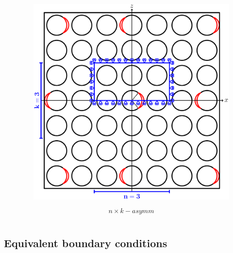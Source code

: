 \documentclass[first,firstsupp,lastsupp,last,hyperref,table]{ETHclass}
\begin{document}
\begin{frame}
\begin{columns}[c]
\begin{column}{0.5\textwidth}
\end{column}
\begin{column}{0.5\textwidth}
\centering
\begin{figure}
\centering
\includegraphics[width=\columnwidth]{asymm.pdf}
\end{figure}
\vspace{-0.25cm}
\begin{equation*}
n\times k-asymm
\end{equation*}
\end{column}
\end{columns}
\end{frame}

\subsection{Equivalent boundary conditions}
\end{document}
